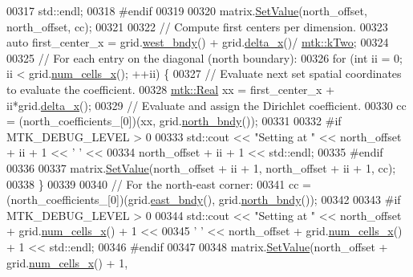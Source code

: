 \begin{DoxyCode}
00317     std::endl;
00318 \textcolor{preprocessor}{  #endif}
00319 
00320   matrix.\hyperlink{classmtk_1_1DenseMatrix_a784ce5784109ac86bfb9d8562b334b13}{SetValue}(north\_offset, north\_offset, cc);
00321 
00322   \textcolor{comment}{// Compute first centers per dimension.}
00323   \textcolor{keyword}{auto} first\_center\_x = grid.\hyperlink{classmtk_1_1UniStgGrid2D_af2b1712387ded85edaf2b64617d3fc13}{west\_bndy}() + grid.\hyperlink{classmtk_1_1UniStgGrid2D_aca4710004c4a7da6a9e8fd6ab32a691f}{delta\_x}()/
      \hyperlink{group__c01-roots_gaf39c2d851a2db744f4feb1c5ab3ec2cf}{mtk::kTwo};
00324 
00325   \textcolor{comment}{// For each entry on the diagonal (north boundary):}
00326   \textcolor{keywordflow}{for} (\textcolor{keywordtype}{int} ii = 0; ii < grid.\hyperlink{classmtk_1_1UniStgGrid2D_a2d182866a398aba8e4829590e85bf939}{num\_cells\_x}(); ++ii) \{
00327     \textcolor{comment}{// Evaluate next set spatial coordinates to evaluate the coefficient.}
00328     \hyperlink{group__c01-roots_gac080bbbf5cbb5502c9f00405f894857d}{mtk::Real} xx = first\_center\_x + ii*grid.\hyperlink{classmtk_1_1UniStgGrid2D_aca4710004c4a7da6a9e8fd6ab32a691f}{delta\_x}();
00329     \textcolor{comment}{// Evaluate and assign the Dirichlet coefficient.}
00330     cc = (north\_coefficients\_[0])(xx, grid.\hyperlink{classmtk_1_1UniStgGrid2D_afe1ead253cdeb5503e0489eba8fd84e2}{north\_bndy}());
00331 
00332 \textcolor{preprocessor}{    #if MTK\_DEBUG\_LEVEL > 0}
00333     std::cout << \textcolor{stringliteral}{"Setting at "} << north\_offset + ii + 1 << \textcolor{charliteral}{' '} <<
00334       north\_offset + ii + 1 << std::endl;
00335 \textcolor{preprocessor}{    #endif}
00336 
00337     matrix.\hyperlink{classmtk_1_1DenseMatrix_a784ce5784109ac86bfb9d8562b334b13}{SetValue}(north\_offset + ii + 1, north\_offset + ii + 1, cc);
00338   \}
00339 
00340   \textcolor{comment}{// For the north-east corner:}
00341   cc = (north\_coefficients\_[0])(grid.\hyperlink{classmtk_1_1UniStgGrid2D_a03f689eb29a6369b82ce1207c655d5ff}{east\_bndy}(), grid.\hyperlink{classmtk_1_1UniStgGrid2D_afe1ead253cdeb5503e0489eba8fd84e2}{north\_bndy}());
00342 
00343 \textcolor{preprocessor}{  #if MTK\_DEBUG\_LEVEL > 0}
00344   std::cout << \textcolor{stringliteral}{"Setting at "} << north\_offset + grid.\hyperlink{classmtk_1_1UniStgGrid2D_a2d182866a398aba8e4829590e85bf939}{num\_cells\_x}() + 1 <<
00345     \textcolor{charliteral}{' '} << north\_offset + grid.\hyperlink{classmtk_1_1UniStgGrid2D_a2d182866a398aba8e4829590e85bf939}{num\_cells\_x}() + 1 << std::endl;
00346 \textcolor{preprocessor}{  #endif}
00347 
00348   matrix.\hyperlink{classmtk_1_1DenseMatrix_a784ce5784109ac86bfb9d8562b334b13}{SetValue}(north\_offset + grid.\hyperlink{classmtk_1_1UniStgGrid2D_a2d182866a398aba8e4829590e85bf939}{num\_cells\_x}() + 1,

\end{DoxyCode}
